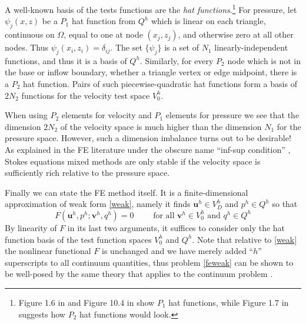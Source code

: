 \documentclass[letterpaper,final,12pt,reqno]{amsart}
\newcommand{\bu}{\mathbf{u}}
\newcommand{\bv}{\mathbf{v}}
\begin{document}
A well-known basis of the tests functions are the \emph{hat functions}.\footnote{Figure 1.6 in \cite{Elmanetal2014} and Figure 10.4 in \cite{Bueler2021} show $P_1$ hat functions, while Figure 1.7 in \cite{Elmanetal2014} suggests how $P_2$ hat functions would look.}  For pressure, let $\psi_j(x,z)$ be a $P_1$ hat function from $Q^h$ which is linear on each triangle, continuous on $\Omega$, equal to one at node $(x_j,z_j)$, and otherwise zero at all other nodes.  Thus $\psi_j(x_i,z_i) = \delta_{ij}$.  The set $\{\psi_j\}$ is a set of $N_1$ linearly-independent functions, and thus it is a basis of $Q^h$.  Similarly, for every $P_2$ node which is not in the base or inflow boundary, whether a triangle vertex or edge midpoint, there is a $P_2$ hat function.  Pairs of such piecewise-quadratic hat functions form a basis of $2N_2$ functions for the velocity test space $V_0^h$.

When using $P_2$ elements for velocity and $P_1$ elements for pressure we see that the dimension $2N_2$ of the velocity space is much higher than the dimension $N_1$ for the pressure space.  However, such a dimension imbalance turns out to be desirable!  As explained in the FE literature under the obscure name ``inf-sup condition'' \cite{Braess2007,Bueler2021,Elmanetal2014}, Stokes equations mixed methods are only stable if the velocity space is sufficiently rich relative to the pressure space.

Finally we can state the FE method itself.  It is a finite-dimensional approximation of weak form \eqref{weak}, namely it finds $\bu^h \in V_D^h$ and $p^h \in Q^h$ so that
\begin{equation}
F(\bu^h,p^h;\bv^h,q^h) = 0 \qquad \text{ for all } \bv^h\in V_0^h \text{ and } q^h\in Q^h  \label{feweak}
\end{equation}
By linearity of $F$ in its last two arguments, it suffices to consider only the hat function basis of the test function spaces $V_0^h$ and $Q^h$.  Note that relative to \eqref{weak} the nonlinear functional $F$ is unchanged and we have merely added ``$h$'' superscripts to all continuum quantities, thus problem \eqref{feweak} can be shown to be well-posed by the same theory that applies to the continuum problem \cite[Theorem 4.3]{JouvetRappaz2011}.
\end{document}
